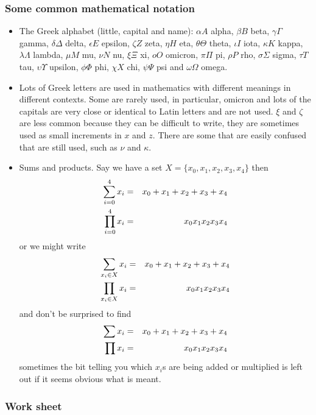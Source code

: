 \documentclass[12pt]{article}
\begin{document}
\subsubsection*{Some common mathematical notation}
\begin{itemize}
\item The Greek alphabet (little, capital and name): $\alpha A$ alpha, $\beta B$ beta, $\gamma \Gamma$ gamma, $\delta \Delta$ delta, $\epsilon E$ epsilon, $\zeta Z$ zeta, $\eta H$ eta, $\theta \Theta$ theta, $\iota I$ iota, $\kappa K$ kappa, $\lambda \Lambda$ lambda, $\mu M$ mu, $\nu N$ nu, $\xi \Xi$ xi, $oO$ omicron, $\pi \Pi$ pi, $\rho P$ rho, $\sigma \Sigma$ sigma, $\tau T$ tau, $\upsilon \Upsilon$ upsilon, $\phi \Phi$ phi, $\chi X$ chi, $\psi \Psi$ psi and $\omega \Omega$ omega. 
\item Lots of Greek letters are used in mathematics with different meanings in different contexts. Some are rarely used, in particular, omicron and lots of the capitals are very close or identical to Latin letters and are not used. $\xi$ and $\zeta$ are less common because they can be difficult to write, they are sometimes used as small increments in $x$ and $z$. There are some that are easily confused that are still used, such as $\nu$ and $\kappa$. 
\item Sums and products. Say we have a set $X=\{x_0,x_1,x_2,x_3,x_4\}$ then
\begin{eqnarray}
\sum_{i=0}^4x_i&=&x_0+x_1+x_2+x_3+x_4\cr
\prod_{i=0}^4x_i&=&x_0x_1x_2x_3x_4
\end{eqnarray}
or we might write
\begin{eqnarray}
\sum_{x_i\in X}x_i&=&x_0+x_1+x_2+x_3+x_4\cr
\prod_{x_i\in X}x_i&=&x_0x_1x_2x_3x_4
\end{eqnarray}
and don't be surprised to find
\begin{eqnarray}
\sum x_i&=&x_0+x_1+x_2+x_3+x_4\cr
\prod x_i&=&x_0x_1x_2x_3x_4
\end{eqnarray} 
sometimes the bit telling you which $x_i$s are being added or multiplied is left out if it seems obvious what is meant.
\end{itemize}


\subsubsection*{Work sheet}
\end{document}
